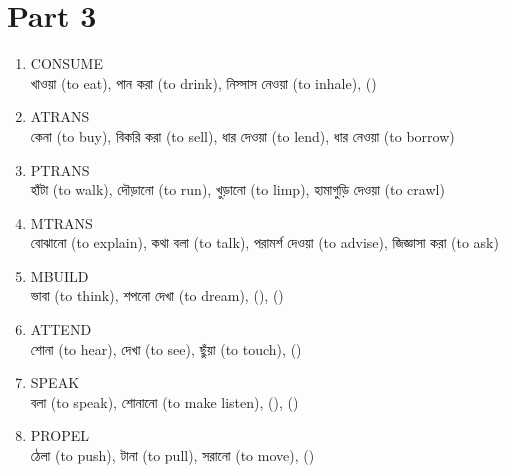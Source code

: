 \documentclass[11pt,a4paper,twocolumn]{article}
\begin{document}
	\section{Part 3}
	{\bg
	\begin{enumerate}
	
		\item CONSUME\\
		\textcolor{hlit}{খাওয়া} (to eat), \textcolor{hlit}{পান করা} (to drink), 
		\textcolor{hlit}{নিস্সাস নেওয়া} (to inhale), ()\\
		
		\item ATRANS\\
		\textcolor{hlit}{কেনা} (to buy), \textcolor{hlit}{বিকরি করা} (to sell), 
		\textcolor{hlit}{ধার দেওয়া} (to lend), \textcolor{hlit}{ধার নেওয়া} (to borrow)\\
		
		\item PTRANS\\
		\textcolor{hlit}{হাঁটা} (to walk), \textcolor{hlit}{দৌড়ানো} (to run), 
		\textcolor{hlit}{খুড়ানো} (to limp), \textcolor{hlit}{হামাগুড়ি দেওয়া} (to crawl)\\
		
		\item MTRANS\\
		\textcolor{hlit}{বোঝানো} (to explain), \textcolor{hlit}{কথা বলা} (to talk), 
		\textcolor{hlit}{পরামর্শ দেওয়া} (to advise), \textcolor{hlit}{জিজ্ঞাসা করা} (to ask)\\
		
		\item MBUILD\\
		\textcolor{hlit}{ভাবা} (to think), \textcolor{hlit}{শপনো দেখা} (to dream), 
		\textcolor{hlit}{} (), \textcolor{hlit}{} ()\\
		
		\item ATTEND\\
		\textcolor{hlit}{শোনা} (to hear), \textcolor{hlit}{দেখা} (to see), 
		\textcolor{hlit}{ছুঁয়া} (to touch), \textcolor{hlit}{} ()\\
		
		\item SPEAK\\
		\textcolor{hlit}{বলা} (to speak), \textcolor{hlit}{শোনানো} (to make listen), 
		\textcolor{hlit}{} (), \textcolor{hlit}{} ()\\
		
		\item PROPEL\\
		\textcolor{hlit}{ঠেলা} (to push), \textcolor{hlit}{টানা} (to pull), 
		\textcolor{hlit}{সরানো} (to move), \textcolor{hlit}{} ()\\
		

\end{enumerate}}
\end{document}
